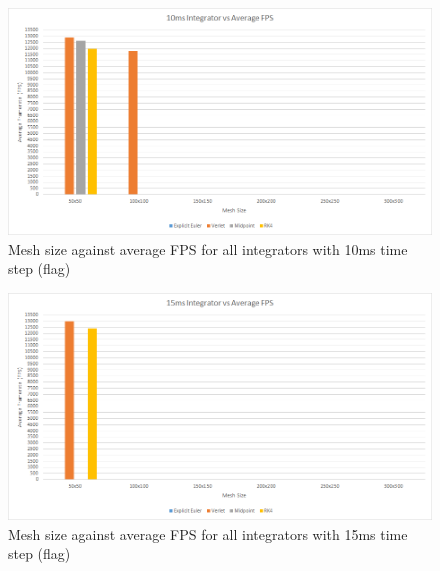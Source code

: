\begin{landscape}
    \begin{figure}[!htb]
    \begin{center}
      \includegraphics{Figures/flag_10ms_int_fps}
    \end{center}
    \caption{Mesh size against average FPS for all integrators with 10ms time step (flag)}
    \label{fig:10ms fps flag}
  \end{figure}

    \begin{figure}[!htb]
    \begin{center}
      \includegraphics{Figures/flag_15ms_int_fps}
    \end{center}
    \caption{Mesh size against average FPS for all integrators with 15ms time step (flag)}
    \label{fig:15ms fps flag}
  \end{figure}
  

\end{landscape}

